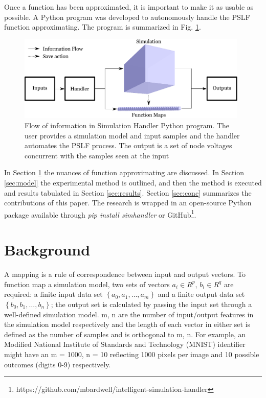 \documentclass[conference]{IEEEtran}
\begin{document}
Once a function has been approximated, it is important to make it as usable as possible. A Python program was developed to autonomously handle the PSLF function approximating. The program is summarized in Fig. \ref{fig:infoflow}.

\begin{figure}[h]
	\centering
	\includegraphics[width=11cm]{informationflow.pdf}
	\caption{Flow of information in Simulation Handler Python program. The user provides a simulation model and input samples and the handler automates the PSLF process. The output is a set of node voltages concurrent with the samples seen at the input	}
	\label{fig:infoflow}
\end{figure}

In Section \ref{sec:relwork} the nuances of function approximating are discussed. In Section \ref{sec:model} the experimental method is outlined, and then the method is executed and results tabulated in Section \ref{sec:results}. Section \ref{sec:conc} summarizes the contributions of this paper. The research is wrapped in an open-source Python package available through \textit{pip install simhandler} or GitHub\footnote{https://github.com/mbardwell/intelligent-simulation-handler}.

\section{Background}
\label{sec:relwork}
A mapping is a rule of correspondence between input and output vectors. To function map a simulation model, two sets of vectors $a_{i} \in R^{p}$, $b_{i} \in R^{q}$ are required: a finite input data set $\left\{a_{0}, a_{1}, \ldots, a_{m}\right\}$ and a finite output data set $\left\{b_{0}, b_{1}, \ldots, b_{n}\right\}$; the output set is calculated by passing the input set through a well-defined simulation model. m, n are the number of input/output features in the simulation model respectively and the length of each vector in either set is defined as the number of samples and is orthogonal to m, n. For example, an Modified National Institute of Standards and Technology (MNIST) identifier might have an m = 1000, n = 10 reflecting 1000 pixels per image and 10 possible outcomes (digits 0-9) respectively.
\end{document}
